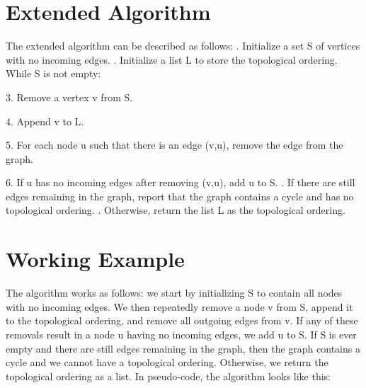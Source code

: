 \documentclass{article}
\begin{document}
\section*{\large Extended Algorithm}
The extended algorithm can be described as follows:\newline
{}.	Initialize a set S of vertices with no incoming edges.\newline
{}.	Initialize a list L to store the topological ordering.\newline
\newline While S is not empty:\newline

     3. Remove a vertex v from S.\newline
     
     4. Append v to L.\newline
     
     5. For each node u such that there is an edge (v,u), remove the edge from the graph.\newline
     
     6. If u has no incoming edges after removing (v,u), add u to S.\newline
{}. If there are still edges remaining in the graph, report that the graph contains a cycle and has no topological ordering.\newline
{}. Otherwise, return the list L as the topological ordering.\newline

\section*{\large Working Example}

\large The algorithm works as follows: we start by initializing S to contain all nodes with no incoming edges. We then repeatedly remove a node v from S, append it to the topological ordering, and remove all outgoing edges from v. If any of these removals result in a node u having no incoming edges, we add u to S. If S is ever empty and there are still edges remaining in the graph, then the graph contains a cycle and we cannot have a topological ordering. Otherwise, we return the topological ordering as a list.
In pseudo-code, the algorithm looks like this:\newline \newline
\end{document}
